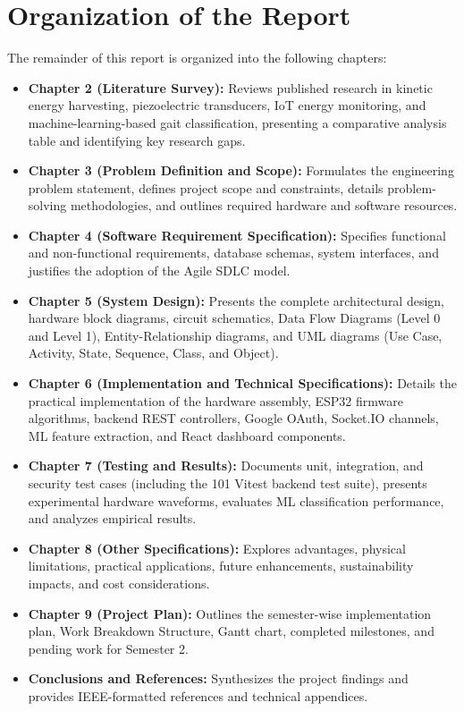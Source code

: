 \section{Organization of the Report}
The remainder of this report is organized into the following chapters:
\begin{itemize}
    \item \textbf{Chapter 2 (Literature Survey):} Reviews published research in kinetic energy harvesting, piezoelectric transducers, IoT energy monitoring, and machine-learning-based gait classification, presenting a comparative analysis table and identifying key research gaps.
    \item \textbf{Chapter 3 (Problem Definition and Scope):} Formulates the engineering problem statement, defines project scope and constraints, details problem-solving methodologies, and outlines required hardware and software resources.
    \item \textbf{Chapter 4 (Software Requirement Specification):} Specifies functional and non-functional requirements, database schemas, system interfaces, and justifies the adoption of the Agile SDLC model.
    \item \textbf{Chapter 5 (System Design):} Presents the complete architectural design, hardware block diagrams, circuit schematics, Data Flow Diagrams (Level 0 and Level 1), Entity-Relationship diagrams, and UML diagrams (Use Case, Activity, State, Sequence, Class, and Object).
    \item \textbf{Chapter 6 (Implementation and Technical Specifications):} Details the practical implementation of the hardware assembly, ESP32 firmware algorithms, backend REST controllers, Google OAuth, Socket.IO channels, ML feature extraction, and React dashboard components.
    \item \textbf{Chapter 7 (Testing and Results):} Documents unit, integration, and security test cases (including the 101 Vitest backend test suite), presents experimental hardware waveforms, evaluates ML classification performance, and analyzes empirical results.
    \item \textbf{Chapter 8 (Other Specifications):} Explores advantages, physical limitations, practical applications, future enhancements, sustainability impacts, and cost considerations.
    \item \textbf{Chapter 9 (Project Plan):} Outlines the semester-wise implementation plan, Work Breakdown Structure, Gantt chart, completed milestones, and pending work for Semester 2.
    \item \textbf{Conclusions and References:} Synthesizes the project findings and provides IEEE-formatted references and technical appendices.
\end{itemize}

